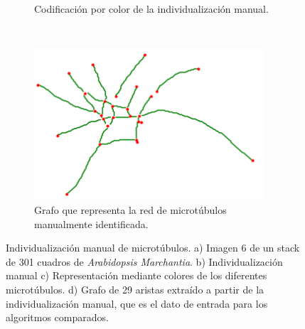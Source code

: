 \begin{figure}[h!]
\begin{subfigure}[t]{0.49\textwidth}
        \caption{Codificaci\'on por color de la individualizaci\'on manual.}
        \label{fig:SpinningMarchantia-indivManual}
    \end{subfigure}
    ~
    \begin{subfigure}[t]{0.49\textwidth}
        \centering
        \includegraphics[height=2.2in]{benchImages/50-ROIs-Spinning-Marchantia-graph-og.png}
        \caption{Grafo que representa la red de microt\'ubulos manualmente identificada.}
        \label{fig:SpinningMarchantia-graph}
    \end{subfigure}
    \caption[Muestra MT-A de {\it Arabidopsis Marchantia} con su individualizaci\'on manual de microt\'ubulos.]{Individualizaci\'on manual de microt\'ubulos. a) Imagen 6 de un stack de 301 cuadros de {\it Arabidopsis Marchantia}. b) Individualizaci\'on manual c) Representaci\'on mediante colores de los diferentes microt\'ubulos. d) Grafo de 29 aristas extra\'ido a partir de la individualizaci\'on manual, que es el dato de entrada para los algoritmos comparados.}
    \label{fig:SpinningMarchantia}
\end{figure}



